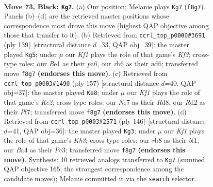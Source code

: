 \documentclass[11pt]{article}
\begin{document}
\clearpage

\begin{figure}[p]\centering
\begin{subfigure}{0.46\textwidth}\centering
\resizebox{\linewidth}{!}{%
\newchessgame
\chessboard[
  setfen={1R3k2/p3n3/P6R/1P3p2/b4P2/8/3r4/4b1K1 b - - 2 73},
  showmover=false,
  pgfstyle=straightmove, color=movearrow, markmove={f8-g7}
]}
\caption{}
\end{subfigure}\hfill
\begin{subfigure}{0.46\textwidth}\centering
\resizebox{\linewidth}{!}{%
\newchessgame
\chessboard[
  setfen={8/8/P2N1k1R/2p1n3/6p1/2P1p1P1/r6P/4K3 b - - 9 70},
  showmover=false,
  pgfstyle=straightmove, color=movearrow, markmove={f6-g5}
]}
\caption{}
\end{subfigure}
\\[4pt]
\begin{subfigure}{0.46\textwidth}\centering
\resizebox{\linewidth}{!}{%
\newchessgame
\chessboard[
  setfen={3r4/4kp2/R7/4nN2/1p4P1/1P3P2/P4K2/8 b - - 8 79},
  showmover=false,
  pgfstyle=straightmove, color=movearrow, markmove={e7-e8}
]}
\caption{}
\end{subfigure}\hfill
\begin{subfigure}{0.46\textwidth}\centering
\resizebox{\linewidth}{!}{%
\newchessgame
\chessboard[
  setfen={6k1/R7/4P2p/6p1/3B2P1/2P2P1K/pr6/5b2 w - - 3 74},
  showmover=false,
  pgfstyle=straightmove, color=movearrow, markmove={h3-g3}
]}
\caption{}
\end{subfigure}
\caption{\textbf{Move 73, Black: \texttt{Kg7}.} (a) Our position; Melanie plays \texttt{Kg7} (\texttt{f8g7}). Panels (b)--(d) are the retrieved master positions whose correspondence most drove this move (highest QAP objective among those that transfer to it). (b) Retrieved from \texttt{ccrl\_top\_p0000\#3691} (ply 139) [structural distance $d$=33, QAP obj=39]: the master played \texttt{Kg5}; under $\mu$ our \emph{Kf1} plays the role of that game's \emph{Kf3}; cross-type roles: our \emph{B}e1 as their \emph{p}a6, our \emph{r}h6 as their \emph{n}d6; transferred move \texttt{f8g7} \textbf{(endorses this move)}. (c) Retrieved from \texttt{ccrl\_top\_p0003\#1490} (ply 157) [structural distance $d$=40, QAP obj=37]: the master played \texttt{Ke8}; under $\mu$ our \emph{Kf1} plays the role of that game's \emph{Ke2}; cross-type roles: our \emph{N}e7 as their \emph{R}d8, our \emph{R}d2 as their \emph{P}f7; transferred move \texttt{f8g7} \textbf{(endorses this move)}. (d) Retrieved from \texttt{ccrl\_top\_p0003\#2571} (ply 146) [structural distance $d$=41, QAP obj=36]: the master played \texttt{Kg3}; under $\mu$ our \emph{Kf1} plays the role of that game's \emph{Kh3}; cross-type roles: our \emph{r}b8 as their \emph{b}f1, our \emph{B}a4 as their \emph{P}c3; transferred move \texttt{f8g7} \textbf{(endorses this move)}. Synthesis: 10 retrieved analogs transferred to \texttt{Kg7} (summed QAP objective 165, the strongest correspondence among the candidate moves); Melanie committed it via the \texttt{search} selector.}
\label{fig:thought-m145}
\end{figure}
\end{document}

